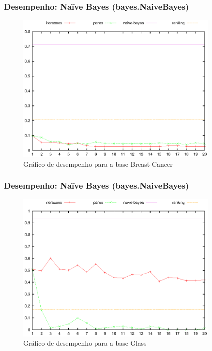 \begin{frame}
    \frametitle{Desempenho: Naïve Bayes (bayes.NaiveBayes)}

    \begin{figure}[H]
        \centering
        \includegraphics[width=0.9\textwidth]{img/breast-cancer_naive-bayes.eps}
        \caption{Gráfico de desempenho para a base Breast Cancer}
    \end{figure}
\end{frame}

\begin{frame}
    \frametitle{Desempenho: Naïve Bayes (bayes.NaiveBayes)}

    \begin{figure}[H]
        \centering
        \includegraphics[width=0.9\textwidth]{img/glass_naive-bayes.eps}
        \caption{Gráfico de desempenho para a base Glass}
    \end{figure}
\end{frame}


